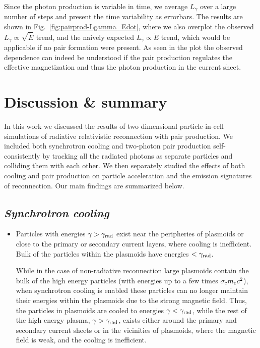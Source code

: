 Since the photon production is variable in time, we average $L_\gamma$ over a large number of steps and present the time variability as errorbars. The results are shown in Fig.~\ref{fig:pairprod-Lgamma_Edot}, where we also overplot the observed $L_\gamma\propto\sqrt{\dot{E}}$ trend, and the naively expected $L_\gamma\propto\dot{E}$ trend, which would be applicable if no pair formation were present. As seen in the plot the observed dependence can indeed be understood if the pair production regulates the effective magnetization and thus the photon production in the current sheet.

\section{Discussion \& summary}
\label{sec:pairprod-discussion}

In this work we discussed the results of two dimensional particle-in-cell simulations of radiative relativistic reconnection with pair production. We included both synchrotron cooling and two-photon pair production self-consistently by tracking all the radiated photons as separate particles and colliding them with each other. We then separately studied the effects of both cooling and pair production on particle acceleration and the emission signatures of reconnection. Our main findings are summarized below.

\subsection*{\small \it Synchrotron cooling}

\begin{itemize}[leftmargin=*,wide = 0pt]
  \item Particles with energies $\gamma>\gamma_{\rm rad}$ exist near the peripheries of plasmoids or close to the primary or secondary current layers, where cooling is inefficient. Bulk of the particles within the plasmoids have energies $<\gamma_{\rm rad}$.

  While in the case of non-radiative reconnection large plasmoids contain the bulk of the high energy particles (with energies up to a few times $\sigma_{\rm c}m_e c^2$), when synchrotron cooling is enabled these particles can no longer maintain their energies within the plasmoids due to the strong magnetic field. Thus, the particles in plasmoids are cooled to energies $\gamma < \gamma_{\rm rad}$, while the rest of the high energy plasma, $\gamma > \gamma_{\rm rad}$, exists either around the primary and secondary current sheets or in the vicinities of plasmoids, where the magnetic field is weak, and the cooling is inefficient.
\end{itemize}


